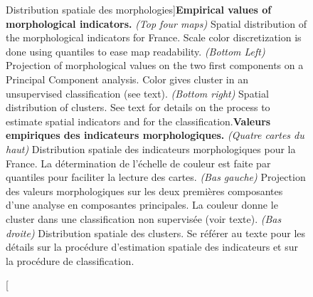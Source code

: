 \begin{figure}
\caption[Spatial distribution of morphologies][Distribution spatiale des morphologies]{\textbf{Empirical values of morphological indicators.} \textit{(Top four maps)} Spatial distribution of the morphological indicators for France. Scale color discretization is done using quantiles to ease map readability. \textit{(Bottom Left)} Projection of morphological values on the two first components on a Principal Component analysis. Color gives cluster in an unsupervised classification (see text). \textit{(Bottom right)} Spatial distribution of clusters. See text for details on the process to estimate spatial indicators and for the classification.\label{fig:staticcorrelations:empirical}}{\textbf{Valeurs empiriques des indicateurs morphologiques.} \textit{(Quatre cartes du haut)} Distribution spatiale des indicateurs morphologiques pour la France. La détermination de l'échelle de couleur est faite par quantiles pour faciliter la lecture des cartes. \textit{(Bas gauche)} Projection des valeurs morphologiques sur les deux premières composantes d'une analyse en composantes principales. La couleur donne le cluster dans une classification non supervisée (voir texte). \textit{(Bas droite)} Distribution spatiale des clusters. Se référer au texte pour les détails sur la procédure d'estimation spatiale des indicateurs et sur la procédure de classification.\label{fig:staticcorrelations:empirical}}
\end{figure}




